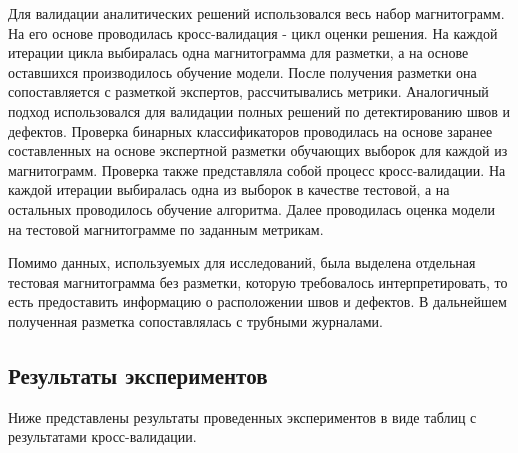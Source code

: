 \documentclass[a4paper,article,14pt]{extarticle}
\begin{document}
Для валидации аналитических решений использовался весь набор магнитограмм. 
На его основе проводилась кросс-валидация - цикл оценки решения. На каждой 
итерации цикла выбиралась одна магнитограмма для разметки, а на основе оставшихся 
производилось обучение модели. После получения разметки она сопоставляется с разметкой 
экспертов, рассчитывались метрики. Аналогичный подход использовался для валидации 
полных решений по детектированию швов и дефектов. Проверка бинарных классификаторов 
проводилась на основе заранее составленных  на основе экспертной разметки обучающих 
выборок для каждой из магнитограмм. Проверка также представляла собой процесс кросс-валидации. 
На каждой итерации выбиралась одна из выборок в качестве тестовой, а на остальных проводилось 
обучение алгоритма. Далее проводилась оценка модели на тестовой магнитограмме по заданным метрикам.

Помимо данных, используемых для исследований, была выделена отдельная тестовая магнитограмма без 
разметки, которую требовалось интерпретировать, то есть предоставить информацию о расположении  
швов и дефектов. В дальнейшем полученная разметка сопоставлялась с трубными журналами.

\subsection{Результаты экспериментов}

Ниже представлены результаты проведенных экспериментов в виде таблиц с результатами кросс-валидации.
\end{document}

